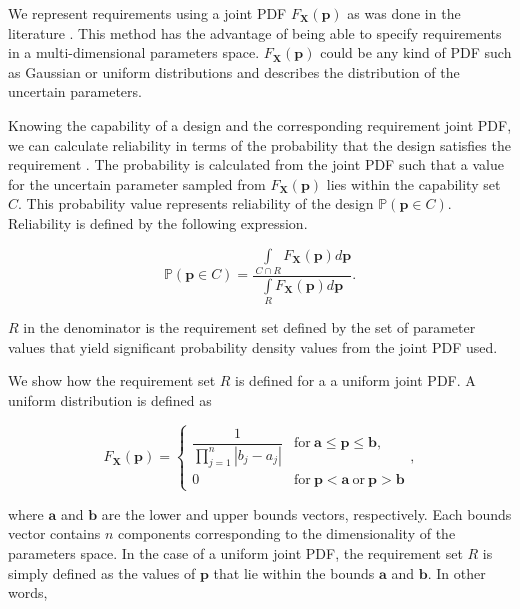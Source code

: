 We represent requirements using a joint \acf{PDF} $F_{\mathbf{X}}\left(\mathbf{p}\right)$ as was done in the literature \cite{Villanueva2014,Pradlwarter2005,Frangopol2003a,Zhu2013a}. This method has the advantage of being able to specify requirements in a multi-dimensional parameters space. $F_{\mathbf{X}}\left(\mathbf{p}\right)$ could be any kind of \ac{PDF} such as Gaussian or uniform distributions and describes the distribution of the uncertain parameters.

Knowing the capability of a design and the corresponding requirement joint \ac{PDF}, we can calculate reliability in terms of the probability that the design satisfies the requirement \cite{ForouzandehShahraki2014,Bucher2009}. The probability is calculated from the joint \ac{PDF} such that a value for the uncertain parameter sampled from $F_{\mathbf{X}}\left(\mathbf{p}\right)$ lies within the capability set $C$. This probability value represents reliability of the design $\mathbb{P}(\mathbf{p} \in C)$. Reliability is defined by the following expression.

\begin{equation} \label{eq:reliability}
	\mathbb{P}(\mathbf{p} \in C) = \dfrac{\int\limits_{C\cap R} F_{\mathbf{X}}(\mathbf{p}) d\mathbf{p}}{\int\limits_{R} F_{\mathbf{X}}(\mathbf{p}) d\mathbf{p}}.
\end{equation}

$R$ in the denominator is the requirement set defined by the set of parameter values that yield significant probability density values from the joint \ac{PDF} used. 

We show how the requirement set $R$ is defined for a a uniform joint \ac{PDF}. A uniform distribution is defined as

\begin{equation} \label{eq:uniformpdf}
	F_\mathbf{X}(\mathbf{p})={\begin{cases}{\dfrac {1}{\prod\limits_{j=1}^{n} \left|b_j - a_j\right|}}&\mathrm {for} \ \mathbf{a}\leq \mathbf{p}\leq \mathbf{b},\\[8pt]0&\mathrm {for} \ \mathbf{p}<\mathbf{a}\ \mathrm {or} \ \mathbf{p}>\mathbf{b}\end{cases}},
\end{equation}

where $\mathbf{a}$ and $\mathbf{b}$ are the lower and upper bounds vectors, respectively. Each bounds vector contains $n$ components corresponding to the dimensionality of the parameters space. In the case of a uniform joint \ac{PDF}, the requirement set $R$ is simply defined as the values of $\mathbf{p}$ that lie within the bounds $\mathbf{a}$ and $\mathbf{b}$. In other words,

